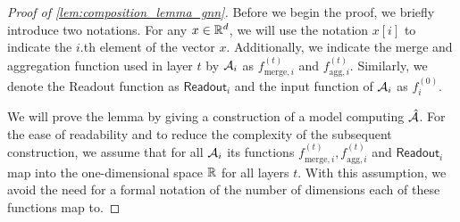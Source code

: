 \begin{proof}[Proof of \cref{lem:composition_lemma_gnn}]
    Before we begin the proof, we briefly introduce two notations. For any $x \in \mathbb{R}^d$, we will use the notation $x[i]$ to indicate the $i$.th element of the vector $x$. Additionally, we indicate the merge and aggregation function used in layer $t$ by $\mathcal{A}_i$ as $f^{(t)}_{\text{merge}, i}$ and $f^{(t)}_{\text{agg}, i}$. Similarly, we denote the \textsf{Readout} function as $\textsf{Readout}_i$ and the input function of $\mathcal{A}_i$ as $f^{(0)}_i$.
    
    We will prove the lemma by giving a construction of a \gnn model computing $\hat{\mathcal{A}}$. For the ease of readability and to reduce the complexity of the subsequent construction, we assume that for all $\mathcal{A}_i$ its functions $f^{(t)}_{\text{merge}, i}, f^{(t)}_{\text{agg}, i}$ and $\textsf{Readout}_i$ map into the one-dimensional space $\mathbb{R}$ for all layers $t$. With this assumption, we avoid the need for a formal notation of the number of dimensions each of these functions map to.


\end{proof}
